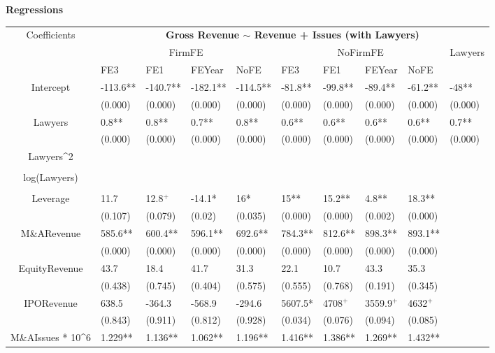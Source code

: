 \documentclass{article}
\begin{document}
\newpage
{\large \textbf{Regressions} }
\begin{table}[H]
\centering
\begin{tabular}{|clllllllll|}
\hline
\multirow{3}{*}{Coefficients} & \multicolumn{9}{c|}{\textbf{Gross Revenue $\sim$ Revenue + Issues (with Lawyers)}} \\
\cline{2-10}
& \multicolumn{4}{c}{FirmFE} & \multicolumn{4}{c}{NoFirmFE} & \multirow{2}{*}{Lawyers} \\
\cline{2-9}
& FE3 & FE1 & FEYear & NoFE & FE3 & FE1 & FEYear & NoFE &  \\
\hline
 
Intercept & -113.6** & -140.7** & -182.1** & -114.5** & -81.8** & -99.8** & -89.4** & -61.2** & -48** \\ 
   & (0.000) & (0.000) & (0.000) & (0.000) & (0.000) & (0.000) & (0.000) & (0.000) & (0.000) \\ 
  Lawyers & 0.8** & 0.8** & 0.7** & 0.8** & 0.6** & 0.6** & 0.6** & 0.6** & 0.7** \\ 
   & (0.000) & (0.000) & (0.000) & (0.000) & (0.000) & (0.000) & (0.000) & (0.000) & (0.000) \\ 
  Lawyers^2 &  &  &  &  &  &  &  &  &  \\ 
   &  &  &  &  &  &  &  &  &  \\ 
  log(Lawyers) &  &  &  &  &  &  &  &  &  \\ 
   &  &  &  &  &  &  &  &  &  \\ 
  Leverage & 11.7 & 12.8$^{+}$ & -14.1* & 16* & 15** & 15.2** & 4.8** & 18.3** &  \\ 
   & (0.107) & (0.079) & (0.02) & (0.035) & (0.000) & (0.000) & (0.002) & (0.000) &  \\ 
  M\&ARevenue & 585.6** & 600.4** & 596.1** & 692.6** & 784.3** & 812.6** & 898.3** & 893.1** &  \\ 
   & (0.000) & (0.000) & (0.000) & (0.000) & (0.000) & (0.000) & (0.000) & (0.000) &  \\ 
  EquityRevenue & 43.7 & 18.4 & 41.7 & 31.3 & 22.1 & 10.7 & 43.3 & 35.3 &  \\ 
   & (0.438) & (0.745) & (0.404) & (0.575) & (0.555) & (0.768) & (0.191) & (0.345) &  \\ 
  IPORevenue & 638.5 & -364.3 & -568.9 & -294.6 & 5607.5* & 4708$^{+}$ & 3559.9$^{+}$ & 4632$^{+}$ &  \\ 
   & (0.843) & (0.911) & (0.812) & (0.928) & (0.034) & (0.076) & (0.094) & (0.085) &  \\ 
  M\&AIssues * 10^6 & 1.229** & 1.136** & 1.062** & 1.196** & 1.416** & 1.386** & 1.269** & 1.432** &  \\ 

\end{tabular}
\end{table}
\end{document}
